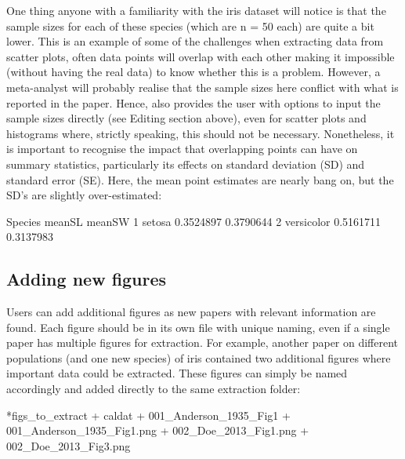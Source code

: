 \documentclass[article]{jss}
\begin{document}
One thing anyone with a familiarity with the iris dataset will notice is that the sample sizes for each of these species (which are n = 50 each) are quite a bit lower. This is an example of some of the challenges when extracting data from scatter plots, often data points will overlap with each other making it impossible (without having the real data) to know whether this is a problem. However, a meta-analyst will probably realise that the sample sizes here conflict with what is reported in the paper. Hence,  also provides the user with  options to input the sample sizes directly (see Editing section above), even for scatter plots and histograms where, strictly speaking, this should not be necessary. Nonetheless, it is important to recognise the impact that overlapping points can have on summary statistics, particularly its effects on standard deviation (SD) and standard error (SE). Here, the mean point estimates are nearly bang on, but the SD's are slightly over-estimated:

\begin{CodeChunk}
\begin{CodeOutput}
     Species    meanSL    meanSW
1     setosa 0.3524897 0.3790644
2 versicolor 0.5161711 0.3137983
\end{CodeOutput}
\end{CodeChunk}






\subsection{Adding new figures}

Users can add additional figures as new papers with relevant information are found. Each figure should be in its own file with unique naming, even if a single paper has multiple figures for extraction. For example, another paper on different populations (and one new species) of iris contained two additional figures where important data could be extracted. These figures can simply be named accordingly and added directly to the same extraction folder: 

\begin{CodeChunk}
\begin{CodeOutput}
*figs_to_extract
	+ caldat
	  	+ 001_Anderson_1935_Fig1
    + 001_Anderson_1935_Fig1.png
    + 002_Doe_2013_Fig1.png
    + 002_Doe_2013_Fig3.png
\end{CodeOutput}
\end{CodeChunk}
\end{document}
